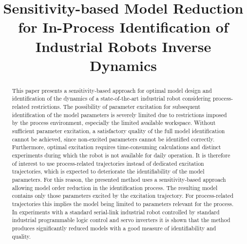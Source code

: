 \documentclass[conference,letterpaper]{IEEEtran}
\begin{document}
\title{Sensitivity-based Model Reduction for In-Process Identification of Industrial Robots Inverse Dynamics}

\author{
}

\maketitle

\begin{abstract}
This paper presents a sensitivity-based approach for optimal model design and identification of the dynamics of a state-of-the-art industrial robot considering process-related restrictions.
The possibility of parameter excitation for subsequent identification of the model parameters is severely limited due to restrictions imposed by the process environment, especially the limited available workspace. 
Without sufficient parameter excitation, a satisfactory quality of the full model identification cannot be achieved, since non-excited parameters cannot be identified correctly.  
Furthermore, optimal excitation requires time-consuming calculations and distinct experiments during which the robot is not available for daily operation. 
It is therefore of interest to use process-related trajectories instead of dedicated excitation trajectories, which is expected to deteriorate the identifiability of the model parameters.
For this reason, the presented method uses a sensitivity-based approach allowing model order reduction in the identification process. The resulting model contains only those parameters excited by the excitation trajectory. For process-related trajectories this implies the model being limited to parameters relevant for the process. 
In experiments with a standard serial-link industrial robot controlled by standard industrial programmable logic control and servo inverters it is shown that the method produces significantly reduced models with a good measure of identifiability and quality.
\end{abstract}













%

\end{document}
